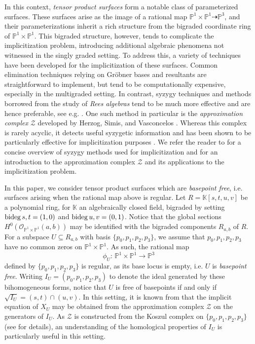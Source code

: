 \documentclass[reqno]{amsart}
\numberwithin{equation}{section}
\theoremstyle{definition}
\def\K{\mathbb{K}}
\def\O{\mathcal{O}}
\def\P{\mathbb{P}}
\def\Z{\mathcal{Z}}
\def\bideg{\mathop{\rm bideg}}
\begin{document}
In this context, \textit{tensor product surfaces} form a notable class of parameterized surfaces. These surfaces arise as the image of a rational map $\P^1\times \P^1\dashrightarrow \P^3$, and their parameterizations inherit a rich structure from the bigraded coordinate ring of $\P^1\times \P^1$. This bigraded structure, however, tends to complicate the implicitization problem, introducing additional algebraic phenomena not witnessed in the singly graded setting. To address this, a variety of techniques have been developed for the implicitization of these surfaces. Common elimination techniques relying on Gr\"obner bases and resultants are straightforward to implement, but tend to be computationally expensive, especially in the multigraded setting. In contrast, syzygy techniques and methods borrowed from the study of \textit{Rees algebras} tend to be much more effective and are hence preferable, see e.g. \cite{Botbol11,BDD09,BC05,BJ03,WG18,Weaver26}. One such method in particular is the \textit{approximation complex} $\Z$ developed by Herzog, Simis, and Vasconcelos \cite{HSV82,HSV83}. Whereas this complex is rarely acyclic, it detects useful syzygetic information and has been shown to be particularly effective for implicitization purposes \cite{Botbol11, BC05, Chardin06,DS16,SSV14,Weaver25}. We refer the reader to \cite{Cox03} for a concise overview of syzygy methods used for implicitization and \cite{Chardin06} for an introduction to the approximation complex $\Z$ and its applications to the implicitization problem.


In this paper, we consider tensor product surfaces which are \textit{basepoint free}, i.e. surfaces arising when the rational map above is regular. Let $R=\K[s,t,u,v]$ be a polynomial ring, for $\K$ an algebraically closed field, bigraded by setting $\bideg s,t =(1,0)$ and $\bideg u,v = (0,1)$. Notice that the global sections $H^0(\O_{\P^1\times \P^1}(a,b))$ may be identified with the bigraded components $R_{a,b}$ of $R$. For a subspace $U\subseteq R_{a,b}$ with basis $\{p_0,p_1,p_2,p_3\}$, we assume that $p_0,p_1,p_2,p_3$ have no common zeros on $\P^1\times \P^1$. As such, the rational map 
$$\phi_U:\,\P^1\times \P^1 \longrightarrow \P^3$$
defined by $\{p_0,p_1,p_2,p_3\}$ is regular, as its base locus is empty, i.e. $U$ is \textit{basepoint free}. Writing $I_U=(p_0,p_1,p_2,p_3)$ to denote the ideal generated by these bihomogeneous forms, notice that $U$ is free of basepoints if and only if $\sqrt{I_U} = (s,t)\cap (u,v)$. In this setting, it is known from \cite{BDD09} that the implicit equation of $X_U$ may be obtained from the approximation complex $\Z$ on the generators of $I_U$. As $\Z$ is constructed from the Koszul complex on $\{p_0,p_1,p_2,p_3\}$ (see  for details), an understanding of the homological properties of $I_U$ is particularly useful in this setting.
\end{document}
